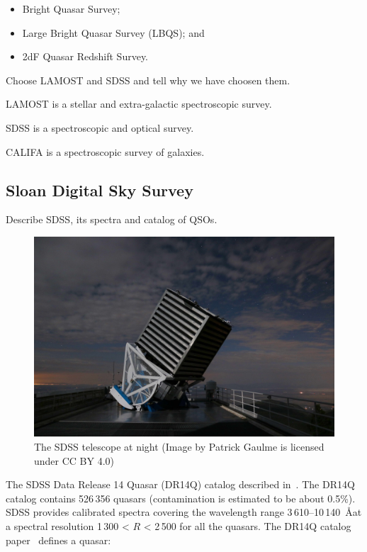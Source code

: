 \begin{itemize}
	\item Bright Quasar Survey;
	\item Large Bright Quasar Survey (LBQS); and
	\item 2dF Quasar Redshift Survey.
\end{itemize}

Choose LAMOST and SDSS and tell why we have choosen them.

LAMOST is a stellar and extra-galactic spectroscopic survey.

SDSS is a spectroscopic and optical survey.

CALIFA is a spectroscopic survey of galaxies.

\subsection{Sloan Digital Sky Survey}

Describe SDSS, its spectra and catalog of QSOs.

\begin{figure}
	\includegraphics[width=\textwidth]{img/sdss_gaulme.jpg}
	\caption{The SDSS telescope at night (Image by Patrick Gaulme is licensed under CC BY 4.0)}
	\label{sdss_telescope}
\end{figure}

The SDSS Data Release 14 Quasar (DR14Q) catalog described in~\cite{paris2018}. %
The DR14Q catalog contains 526\,356 quasars (contamination is estimated to be about 0.5\%).
SDSS provides calibrated spectra covering the wavelength range 3\,610--10\,140~\AA at a spectral resolution 1\,300 < \(R\) < 2\,500 for all the quasars.
The DR14Q catalog paper~\cite{paris2018} defines a quasar:

